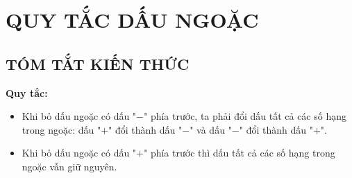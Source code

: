 \section{QUY TẮC DẤU NGOẶC}
\subsection{TÓM TẮT KIẾN THỨC}
\begin{tomtat}
\textbf{Quy tắc:}
\begin{itemize}
\item Khi bỏ dấu ngoặc có dấu "$-$" phía trước, ta phải đổi dấu tất cả các số hạng trong ngoặc: dấu "$+$" đổi thành dấu "$-$" và dấu "$-$" đổi thành dấu "$+$".
\item Khi bỏ dấu ngoặc có dấu "$+$" phía trước thì dấu tất cả các số hạng trong ngoặc vẫn giữ nguyên.
\end{itemize}

\end{tomtat}
